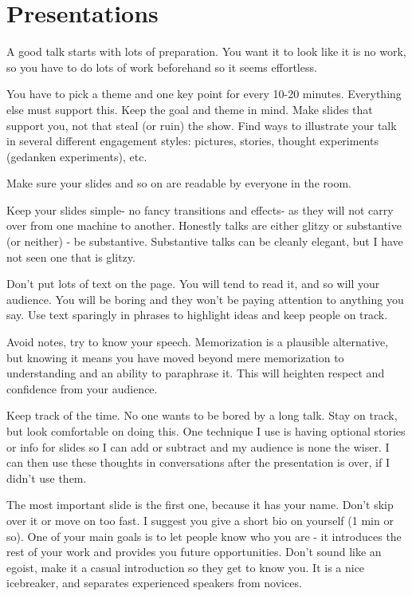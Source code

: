 \section{Presentations}

A good talk starts with lots of preparation.  You want it to look like it is no work, so you have to do lots of work beforehand so it seems effortless.

You have to pick a theme and one key point for every 10-20 minutes.  Everything else must support this.  Keep the goal and theme in mind.  Make slides that support you, not that steal (or ruin) the show.  Find ways to illustrate your talk in several different engagement styles: pictures, stories, thought experiments (gedanken experiments), etc.

Make sure your slides and so on are readable by everyone in the room.

Keep your slides simple- no fancy transitions and effects- as they will not carry over from one machine to another.  Honestly talks are either glitzy or substantive (or neither) - be substantive.  Substantive talks can be cleanly elegant, but I have not seen one that is glitzy.

Don't put lots of text on the page.  You will tend to read it, and so will your audience.  You will be boring and they won't be paying attention to anything you say.  Use text sparingly in phrases to highlight ideas and keep people on track.

Avoid notes, try to know your speech.  Memorization is a plausible alternative, but knowing it means you have moved beyond mere memorization to understanding and an ability to paraphrase it.  This will heighten respect and confidence from your audience.

Keep track of the time.  No one wants to be bored by a long talk.  Stay on track, but look comfortable on doing this.  One technique I use is having optional stories or info for slides so I can add or subtract and my audience is none the wiser.  I can then use these thoughts in conversations after the presentation is over, if I didn't use them.

The most important slide is the first one, because it has your name.  Don't skip over it or move on too fast.  I suggest you give a short bio on yourself (1 min or so).  One of your main goals is to let people know who you are - it introduces the rest of your work and provides you future opportunities.  Don't sound like an egoist, make it a casual introduction so they get to know you.  It is a nice icebreaker, and separates experienced speakers from novices.

